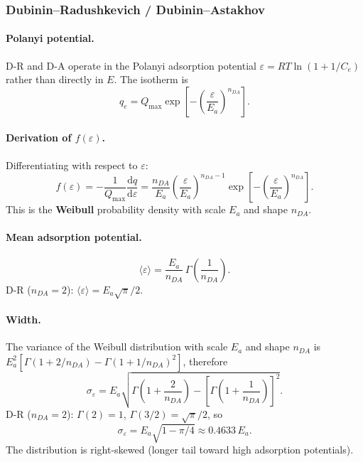 \documentclass[journal=jacsat,manuscript=article]{achemso}
\begin{document}
\subsubsection{Dubinin--Radushkevich / Dubinin--Astakhov}

\paragraph{Polanyi potential.}
D-R and D-A operate in the Polanyi adsorption potential
$\varepsilon = RT\ln(1 + 1/C_e)$ rather than directly in $E$.
The isotherm is
\begin{equation}
	q_e = Q_{\max}\exp\!\left[-\!\left(\frac{\varepsilon}{E_a}\right)^{\!n_{DA}}\right].
\end{equation}

\paragraph{Derivation of $f(\varepsilon)$.}
Differentiating with respect to $\varepsilon$:
\begin{equation}
	f(\varepsilon) = -\frac{1}{Q_{\max}}\frac{\mathrm{d}q}{\mathrm{d}\varepsilon}
	= \frac{n_{DA}}{E_a}\left(\frac{\varepsilon}{E_a}\right)^{n_{DA}-1}
	\exp\!\left[-\!\left(\frac{\varepsilon}{E_a}\right)^{n_{DA}}\right].
	\label{eq:si_fE_DA}
\end{equation}
This is the \textbf{Weibull} probability density with scale $E_a$
and shape $n_{DA}$.

\paragraph{Mean adsorption potential.}
\begin{equation}
	\langle\varepsilon\rangle
	= \frac{E_a}{n_{DA}}\,\Gamma\!\left(\frac{1}{n_{DA}}\right).
\end{equation}
D-R ($n_{DA}=2$): $\langle\varepsilon\rangle = E_a\sqrt{\pi}/2$.

\paragraph{Width.}
The variance of the Weibull distribution with scale $E_a$ and shape $n_{DA}$ is
$E_a^2[\Gamma(1+2/n_{DA})-\Gamma(1+1/n_{DA})^2]$, therefore
\begin{equation}
	\sigma_\varepsilon
	= E_a\sqrt{\Gamma\!\left(1+\frac{2}{n_{DA}}\right)
	           - \left[\Gamma\!\left(1+\frac{1}{n_{DA}}\right)\right]^{2}}.
	\label{eq:si_sigmaE_DA}
\end{equation}
D-R ($n_{DA}=2$): $\Gamma(2)=1$, $\Gamma(3/2)=\sqrt{\pi}/2$, so
\begin{equation}
	\sigma_\varepsilon = E_a\sqrt{1-\pi/4} \approx 0.4633\,E_a.
\end{equation}
The distribution is right-skewed (longer tail toward high adsorption potentials).
\end{document}

